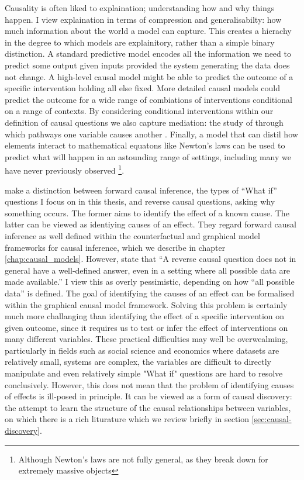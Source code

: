 \documentclass[11pt,a4paper,oneside]{book}
\newcommand{\quotes}[1]{``#1''}
\theoremstyle{plain}
\theoremstyle{definition}
\begin{document}
Causality is often liked to explaination; understanding how and why things happen. I view explaination in terms of compression and generalisabilty: how much information about the world a model can capture. This creates a hierachy in the degree to which models are explainitory, rather than a simple binary distinction. A standard predictive model encodes all the information we need to predict some output given inputs provided the system generating the data does not change. A high-level causal model might be able to predict the outcome of a specific intervention holding all else fixed. More detailed causal models could predict the outcome for a wide range of combiations of interventions conditional on a range of contexts. By considering conditional interventions within our definition of causal questions we also capture mediation: the study of through which pathways one variable causes another \cite{vanderweele2015explanation}. Finally, a model that can distil how elements interact to mathematical equatons like Newton's laws can be used to predict what will happen in an astounding range of settings, including many we have never previously observed \footnote{Although Newton's laws are not fully general, as they break down for extremely massive objects}.

\citet{Gelman2010,gelman2013ask} make a distinction between forward causal inference, the types of \quotes{What if} questions I focus on in this thesis, and reverse causal questions, asking why something occurs. The former aims to identify the effect of a known cause. The latter can be viewed as identiying causes of an effect. They regard forward causal inference as well defined within the counterfactual and graphical model frameworks for causal inference, which we describe in chapter \ref{chap:causal_models}. However, state that \quotes{A reverse causal question does not in general have a well-defined answer, even in a setting where all possible data are made available.} I view this as overly pessimistic, depending on how \quotes{all possible data} is defined. The goal of identifying the causes of an effect can be formalised within the graphical causal model framework. Solving this problem is certainly much more challanging than identifying the effect of a specific intervention on given outcome, since it requires us to test or infer the effect of interventions on many different variables. These practical difficulties may well be overwealming, particularly in fields such as social science and economics where datasets are relatively small, systems are complex, the variables are difficult to directly manipulate and even relatively simple "What if" questions are hard to resolve conclusively. However, this does not mean that the problem of identifying causes of effects is ill-posed in principle. It can be viewed as a form of causal discovery: the attempt to learn the structure of the causal relationships between variables, on which there is a rich liturature which we review briefly in section \ref{sec:causal-discovery}.
\end{document}
